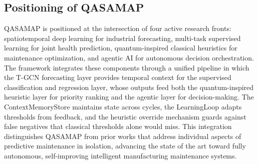 \subsection{Positioning of QASAMAP}

QASAMAP is positioned at the intersection of four active research fronts: spatiotemporal deep learning for industrial forecasting, multi-task supervised learning for joint health prediction, quantum-inspired classical heuristics for maintenance optimization, and agentic AI for autonomous decision orchestration. The framework integrates these components through a unified pipeline in which the T-GCN forecasting layer provides temporal context for the supervised classification and regression layer, whose outputs feed both the quantum-inspired heuristic layer for priority ranking and the agentic layer for decision-making. The ContextMemoryStore maintains state across cycles, the LearningLoop adapts thresholds from feedback, and the heuristic override mechanism guards against false negatives that classical thresholds alone would miss. This integration distinguishes QASAMAP from prior works that address individual aspects of predictive maintenance in isolation, advancing the state of the art toward fully autonomous, self-improving intelligent manufacturing maintenance systems.
